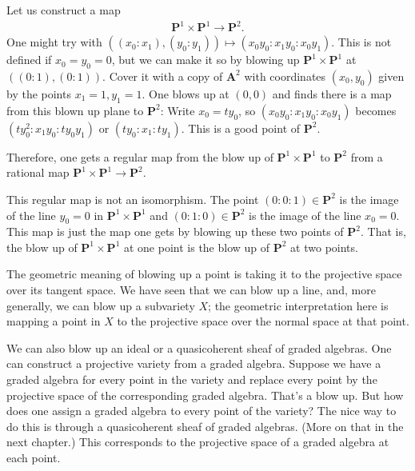 \documentclass[11pt, oneside,margin=1in]{article}
\begin{document}
\begin{example}[ ]\label{}\text{}
Let us construct a map 
\begin{align*}
	\mathbf{P}^1\times \mathbf{P}^1\longrightarrow \mathbf{P}^2.
\end{align*}
One might try with $((x_0:x_1),(y_0:y_1)) \longmapsto (x_0y_0:x_1y_0:x_0y_1)$. This is not defined if $x_0=y_0=0$, but we can make it so by blowing up $\mathbf{P}^1\times \mathbf{P}^1$ at $((0:1), (0:1) )$. Cover it with a copy of $\mathbf{A}^2$ with coordinates $(x_0,y_0)$ given by the points $x_1=1,y_1=1$. One blows up at $(0,0)$ and finds there is a map from this blown up plane to $\mathbf{P}^2$: Write $x_0=ty_0$, so $(x_0y_0:x_1y_0:x_0y_1)$ becomes $(ty_0^2:x_1y_0:ty_0y_1)$ or $(ty_0:x_1:ty_1)$. This is a good point of $\mathbf{P}^2$.

Therefore, one gets a regular map from the blow up of $\mathbf{P}^1\times \mathbf{P}^1$ to $\mathbf{P}^2$ from a rational map $\mathbf{P}^1\times \mathbf{P}^1\longrightarrow \mathbf{P}^2$.

\begin{remark}
	This regular map is not an isomorphism. The point $(0:0:1)\in  \mathbf{P}^2$ is the image of the line $y_0=0$ in $\mathbf{P}^1\times \mathbf{P}^1$ and $(0:1:0)\in \mathbf{P}^2$ is the image of the line $x_0=0$. This map is just the map one gets by blowing up these two points of $\mathbf{P}^2$. That is, the blow up of $\mathbf{P}^1\times \mathbf{P}^1$ at one point is the blow up of $\mathbf{P}^2$ at two points.
\end{remark}
\end{example}

The geometric meaning of blowing up a point is taking it to the projective space over its tangent space. We have seen that we can blow up a line, and, more generally, we can blow up a subvariety $X$; the geometric interpretation here is mapping a point in $X$ to the projective space over the normal space at that point. 

We can also blow up an ideal or a quasicoherent sheaf of graded algebras. One can construct a projective variety from a graded algebra. Suppose we have a graded algebra for every point in the variety and replace every point by the projective space of the corresponding graded algebra. That's a blow up. But how does one assign a graded algebra to every point of the variety? The nice way to do this is through a quasicoherent sheaf of graded algebras. (More on that in the next chapter.) This corresponds to the projective space of a graded algebra at each point.
\end{document}
